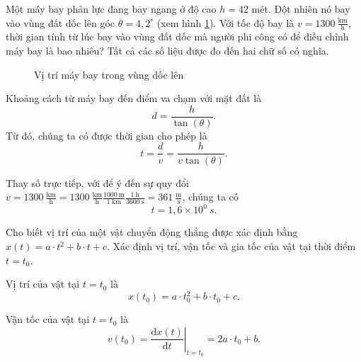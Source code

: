 \documentclass[a4paper, titlepage, openany]{book}
\newcounter{exercise}
\newcounter{solution}
\begin{document}
\exercise Một máy bay phản lực đang bay ngang ở độ cao $h=42$ mét. Đột nhiên nó bay vào vùng đất dốc lên góc $\theta=4{,}2^\circ$ (xem hình \ref{fig:may_bay_doc}). Với tốc độ bay là $v=1300\ \frac{\text{km}}{\text{h}}$, thời gian tính từ lúc bay vào vùng đất dốc mà người phi công có để điều chỉnh máy bay là bao nhiêu? Tất cả các số liệu được đo đến hai chữ số có nghĩa.

\begin{figure}[h]
   \centering
   \caption{Vị trí máy bay trong vùng dốc lên}
   \label{fig:may_bay_doc}
\end{figure}

\solution

Khoảng cách từ máy bay đến điểm va chạm với mặt đất là $$d=\frac{h}{\tan{(\theta)}}.$$ Từ đó, chúng ta có được thời gian cho phép là $$t=\frac{d}{v}=\frac{h}{v\tan{(\theta)}}.$$

Thay số trực tiếp, với để ý đến sự quy đổi $v=1300\ \frac{\text{km}}{\text{h}}=1300\ \frac{\text{km}}{\text{h}}\frac{1000\ \text{m}}{1\ \text{km}}\frac{1\ \text{h}}{3600\ \text{s}}=361\ \frac{\text{m}}{\text{s}}$, chúng ta có $$t=\boxed{1{,}6\times 10^0\ s}.$$

\exercise Cho biết vị trí của một vật chuyển động thẳng được xác định bằng $x(t) = a\cdot t^2+b\cdot t+c$. Xác định vị trí, vận tốc và gia tốc của vật tại thời điểm $t=t_0$.

\solution

Vị trí của vật tại $t=t_0$ là $$x\left(t_0\right)=\boxed{a\cdot t_0^2+b\cdot t_0+c}.$$

Vận tốc của vật tại $t=t_0$ là $$v\left(t_0\right)=\left.\frac{\mathrm{d}x(t)}{\mathrm{d}t}\right|_{t=t_0}=\boxed{2a\cdot t_0+b}.$$
\end{document}
